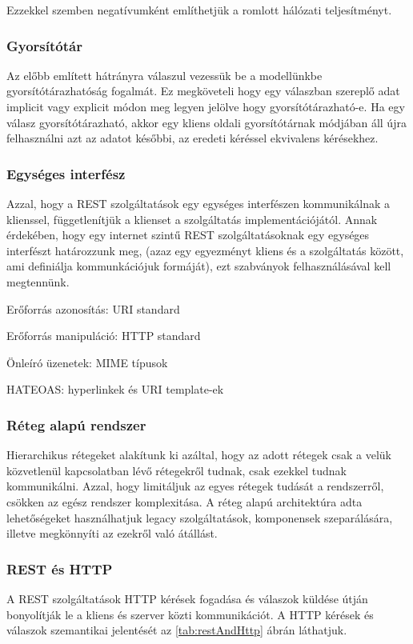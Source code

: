 Ezzekkel szemben negatívumként említhetjük a romlott hálózati teljesítményt.

\subsubsection{Gyorsítótár}

Az előbb említett hátrányra válaszul vezessük be a modellünkbe gyorsítótárazhatóság fogalmát. Ez megköveteli hogy egy válaszban szereplő adat implicit vagy explicit módon meg legyen jelölve hogy gyorsítótárazható-e. Ha egy válasz gyorsítótárazható, akkor egy kliens oldali gyorsítótárnak módjában áll újra felhasználni azt az adatot későbbi, az eredeti kéréssel ekvivalens kérésekhez.

\subsubsection{Egységes interfész}

Azzal, hogy a REST szolgáltatások egy egységes interfészen kommunikálnak a klienssel, függetlenítjük a klienset a szolgáltatás implementációjától. Annak érdekében, hogy egy internet szintű REST szolgáltatásoknak egy egységes interfészt határozzunk meg, (azaz egy egyezményt kliens és a szolgáltatás között, ami definiálja kommunkációjuk formáját), ezt szabványok felhasználásával kell megtennünk.

\begin{listing}
	\item Erőforrás azonosítás: URI standard \cite{RFC3986}
	\item Erőforrás manipuláció: HTTP standard \cite{RFC2616}
	\item Önleíró üzenetek: MIME típusok \cite{RFC2045}
	\item HATEOAS: hyperlinkek és URI template-ek \cite{RFC6570}
\end{listing}

\subsubsection{Réteg alapú rendszer}

Hierarchikus rétegeket alakítunk ki azáltal, hogy az adott rétegek csak a velük közvetlenül kapcsolatban lévő rétegekről tudnak, csak ezekkel tudnak kommunikálni. Azzal, hogy limitáljuk az egyes rétegek tudását a rendszerről, csökken az egész rendszer komplexitása. A réteg alapú architektúra adta lehetőségeket használhatjuk legacy szolgáltatások, komponensek szeparálására, illetve megkönnyíti az ezekről való átállást.

\subsubsection{REST és HTTP}

A REST szolgáltatások HTTP kérések fogadása és válaszok küldése útján bonyolítják le a kliens és szerver közti kommunikációt. A HTTP kérések és válaszok szemantikai jelentését az \ref{tab:restAndHttp} ábrán láthatjuk.
